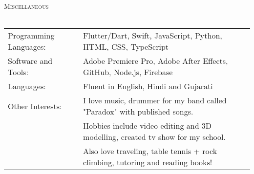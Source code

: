 \documentclass[a4paper]{article}
\newcommand{\lineunder} {
    \vspace*{-8pt} \\
    \hspace*{-18pt} \hrulefill \\
}
\newcommand{\header} [1] {
    {\hspace*{-18pt}\vspace*{6pt} \textsc{#1}}
    \vspace*{-6pt} \lineunder
}
\begin{document}
\header{Miscellaneous}
\begin{tabular}{ l l }
	Programming Languages: & Flutter/Dart, Swift, JavaScript, Python, HTML, CSS, TypeScript     \\
	Software and Tools:    & Adobe Premiere Pro, Adobe After Effects, GitHub, Node.js, Firebase \\
    Languages:    & Fluent in English, Hindi and Gujarati \\
    Other Interests:    & I love music, drummer for my band called "Paradox" with published songs. \\
                        & Hobbies include video editing and 3D modelling, created tv show for my school. \\
                        & Also love traveling, table tennis + rock climbing, tutoring and reading books! \\
\end{tabular}

\vspace*{-80pt}
\end{document}
